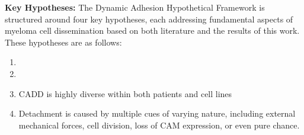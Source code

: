 


\newcommand{\cadddiversity}{%
      \ac{CADD} is highly diverse within both patients and cell lines %
}%
\newcommand{\cadddiversitytitle}{ %
      \textit{Hypothesis 3}: CADD is Highly Diverse Within both Patients
      and Cell Lines%
}%


\newcommand{\caddtrigger}{%
      Detachment is caused by multiple cues of varying nature, including
      external mechanical forces, cell division, loss of \ac{CAM} expression, or
      even pure chance. }%
\newcommand{\caddtriggertitle}{ %
      \textit{Hypothesis 4}: Detachment is Caused by Multiple Cues of Varying
      Nature %
}%


\textbf{Key Hypotheses:}
The Dynamic Adhesion Hypothetical Framework is structured around four key
hypotheses, each addressing fundamental aspects of myeloma cell dissemination
based on both literature and the results of this work. These hypotheses are as
follows:

\begin{enumerate}[parsep=4pt]
      \item \caddadaptation
      \item \caddadaptibility
      \item \cadddiversity
      \item \caddtrigger
\end{enumerate}



